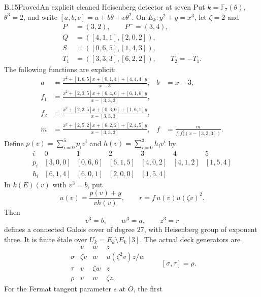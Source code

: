 \begin{statement}{B.15}{Proved}{An explicit cleaned Heisenberg detector at seven}
Put $k=\mathbb F_7(\theta)$, $\theta^3=2$, and write
$[a,b,c]=a+b\theta+c\theta^2$.  On
$E_k:y^2+y=x^3$, let $\zeta=2$ and
\[
 \begin{split}
 P&=(3,2),\qquad P^-=(3,4),\\
 Q&=([4,1,1],[2,0,2]),\\
 S&=([0,6,5],[1,4,3]),\\
 T_1&=([3,3,3],[6,2,2]),\qquad T_2=-T_1 .
 \end{split}                                               \tag{B.15.1}
\]
The following functions are explicit:
\[
 \begin{aligned}
 a&=\frac{x^2+[1,6,5]x+[0,1,4]+[4,4,4]y}{x-3},&
 b&=x-3,\\
 f_1&=\frac{x^2+[2,3,5]x+[6,4,6]+[6,1,6]y}
                  {x-[3,3,3]},\\
 f_2&=\frac{x^2+[2,3,5]x+[0,3,0]+[1,6,1]y}
                  {x-[3,3,3]},\\
 m&=\frac{x^2+[2,5,2]x+[6,2,2]+[2,4,5]y}
                  {x-[3,3,3]},&
 f&=\frac{m}{f_1f_2^2(x-[3,3,3])}.
 \end{aligned}                                             \tag{B.15.2}
\]
Define $p(v)=\sum_{i=0}^5p_iv^i$ and
$h(v)=\sum_{i=0}^3h_iv^i$ by
\[
 \begin{array}{c|rrrrrr}
 i&0&1&2&3&4&5\\ \hline
 p_i&[3,0,0]&[0,6,6]&[6,1,5]&[4,0,2]&[4,1,2]&[1,5,4]\\
 h_i&[6,1,4]&[6,0,1]&[2,0,0]&[1,5,4]&&
 \end{array}                                               \tag{B.15.3}
\]
In $k(E)(v)$ with $v^3=b$, put
\[
 u(v)=\frac{p(v)+y}{v h(v)},\qquad
 r=f\,u(v)u(\zeta v)^2.                                    \tag{B.15.4}
\]
Then
\[
              v^3=b,\qquad w^3=a,\qquad z^3=r               \tag{B.15.5}
\]
defines a connected Galois cover of degree $27$, with
Heisenberg group of exponent three.  It is finite \'etale
over $U_k=E_k\setminus E_k[3]$.
The actual deck generators are
\[
 \begin{array}{c|ccc}
       &v&w&z\\ \hline
 \sigma&\zeta v&w&u(\zeta^2v)z/w\\
 \tau&v&\zeta w&z\\
 \rho&v&w&\zeta z ,
 \end{array}
 \qquad [\sigma,\tau]=\rho.                                 \tag{B.15.6}
\]
For the Fermat tangent parameter $s$ at $O$, the first

\end{statement}
